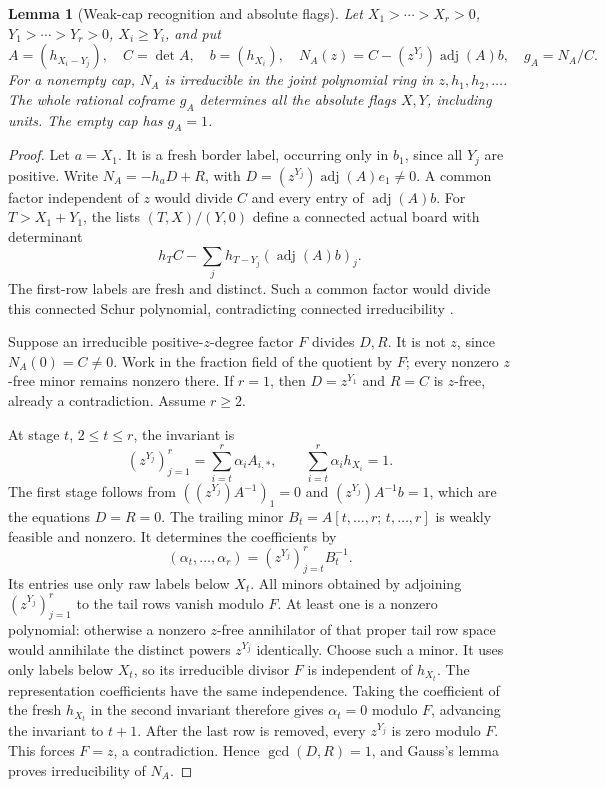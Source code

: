 \documentclass[11pt,a4paper]{amsart}
\numberwithin{equation}{section}
\theoremstyle{plain}
\newtheorem{lemma}[theorem]{Lemma}
\theoremstyle{definition}
\begin{document}
\begin{lemma}[Weak-cap recognition and absolute flags]\label{lem:cap-recognition}
Let \(X_1>\cdots>X_r>0\), \(Y_1>\cdots>Y_r>0\), \(X_i\ge Y_i\), and put
\[
 A=(h_{X_i-Y_j}),\quad C=\det A,\quad b=(h_{X_i}),\quad
 N_A(z)=C-(z^{Y_j})\operatorname{adj}(A)b,\quad g_A=N_A/C.
\]
For a nonempty cap, \(N_A\) is irreducible in the joint polynomial ring in
\(z,h_1,h_2,\ldots\).  The whole rational coframe \(g_A\) determines all the
absolute flags \(X,Y\), including units.  The empty cap has \(g_A=1\).
\end{lemma}
\begin{proof}
Let \(a=X_1\).  It is a fresh border label, occurring only in \(b_1\), since all
\(Y_j\) are positive.  Write
\(N_A=-h_aD+R\), with \(D=(z^{Y_j})\operatorname{adj}(A)e_1\ne0\).
A common factor independent of \(z\) would divide \(C\) and every entry of
\(\operatorname{adj}(A)b\).  For \(T>X_1+Y_1\), the lists \((T,X)/(Y,0)\) define a connected
actual board with determinant
\[
 h_TC-\sum_jh_{T-Y_j}(\operatorname{adj}(A)b)_j.
\]
The first-row labels are fresh and distinct.  Such a common factor would
divide this connected Schur polynomial, contradicting connected irreducibility
\cite{Barekat2009CoincidencesCorrigendum}.

Suppose an irreducible positive-\(z\)-degree factor \(F\) divides
\(D,R\).  It is not \(z\), since \(N_A(0)=C\ne0\).
Work in the fraction field of the quotient by \(F\); every nonzero
\(z\)-free minor remains nonzero there.
If \(r=1\), then \(D=z^{Y_1}\) and \(R=C\) is \(z\)-free, already a
contradiction.  Assume \(r\ge2\).

At stage \(t\), \(2\le t\le r\), the invariant is
\[
 (z^{Y_j})_{j=1}^r=\sum_{i=t}^r\alpha_i A_{i,*},\qquad
 \sum_{i=t}^r\alpha_i h_{X_i}=1.
\]
The first stage follows from
\(((z^{Y_j})A^{-1})_1=0\) and \((z^{Y_j})A^{-1}b=1\),
which are the equations \(D=R=0\).
The trailing minor \(B_t=A[t,\ldots,r;\,t,\ldots,r]\) is weakly
feasible and nonzero.  It determines the coefficients by
\[
 (\alpha_t,\ldots,\alpha_r)=(z^{Y_j})_{j=t}^r B_t^{-1}.
\]
Its entries use only raw labels below \(X_t\).
All minors obtained by adjoining \((z^{Y_j})_{j=1}^r\) to the tail
rows vanish modulo \(F\).  At least one is a nonzero polynomial:
otherwise a nonzero \(z\)-free annihilator of that proper tail row
space would annihilate the distinct powers \(z^{Y_j}\) identically.
Choose such a minor.  It uses only labels below \(X_t\), so its
irreducible divisor \(F\) is independent of \(h_{X_t}\).
The representation coefficients have the same independence.
Taking the coefficient of the fresh \(h_{X_t}\) in the second
invariant therefore gives \(\alpha_t=0\) modulo \(F\), advancing
the invariant to \(t+1\).
After the last row is removed, every \(z^{Y_j}\) is zero modulo \(F\).
This forces \(F=z\), a contradiction.  Hence \(\gcd(D,R)=1\), and
Gauss's lemma proves irreducibility of \(N_A\).


\end{proof}
\end{document}

